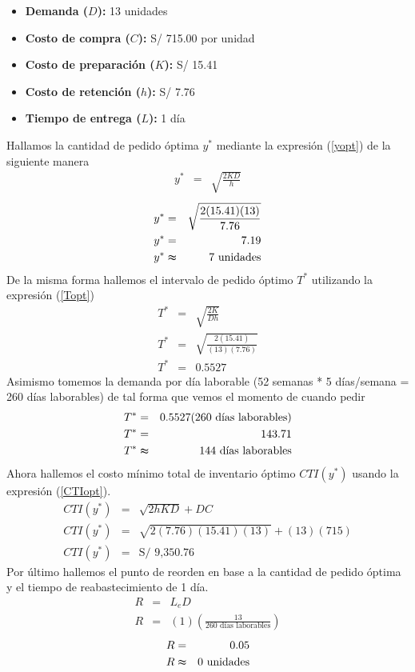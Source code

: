 \begin{itemize}
    \item \textbf{Demanda ($D$):} 13 unidades
    \item \textbf{Costo de compra ($C$):} S/ 715.00 por unidad
    \item \textbf{Costo de preparación ($K$):} S/ 15.41
    \item \textbf{Costo de retención ($h$):} S/ 7.76
    \item \textbf{Tiempo de entrega ($L$):} 1 día
\end{itemize}

Hallamos la cantidad de pedido óptima $y^*$ mediante la expresión (\ref{yopt}) de la siguiente manera
\begin{eqnarray}
    y^* &=& \sqrt{\frac{2KD}{h}} \nonumber
\end{eqnarray}
\begin{eqnarray}
    y^* &=& \sqrt{\frac{2(15.41)(13)}{7.76}} \nonumber \\
    y^* &=& 7.19 \nonumber \\
    y^* &\thickapprox& 7 \text{ unidades} \nonumber
\end{eqnarray}
De la misma forma hallemos el intervalo de pedido óptimo $T^*$ utilizando la expresión (\ref{Topt}) 
\begin{eqnarray}
    T^* &=& \sqrt{\frac{2K}{Dh}} \nonumber \\
    T^* &=& \sqrt{\frac{2(15.41)}{(13)(7.76)}} \nonumber \\
    T^* &=& 0.5527 \nonumber
\end{eqnarray}
Asimismo tomemos la demanda por día laborable (52 semanas * 5 días/semana = 260 días laborables) de tal forma que vemos el momento de cuando pedir
\begin{eqnarray}
    T^* &=& 0.5527 (260 \text{ días laborables}) \nonumber \\   
    T^* &=& 143.71 \nonumber \\
    T^* &\thickapprox& 144 \text{ días laborables} \nonumber
\end{eqnarray}
Ahora hallemos el costo mínimo total de inventario óptimo $CTI(y^*)$ usando la expresión (\ref{CTIopt}).
\begin{eqnarray}
    CTI(y^*) &=& \sqrt{2hKD} + DC \nonumber \\
    CTI(y^*) &=& \sqrt{2(7.76)(15.41)(13)} + (13)(715) \nonumber \\
    CTI(y^*) &=& \text{S/ 9,350.76} \nonumber
\end{eqnarray}
Por último hallemos el punto de reorden en base a la cantidad de pedido óptima y el tiempo de reabastecimiento de 1 día.
\begin{eqnarray}
    R &=& L_e D \nonumber \\
    R &=& (1) \left(\frac{13}{260 \text{ días laborables}} \right) \nonumber
\end{eqnarray}
\begin{eqnarray}
    R &=& 0.05 \nonumber \\
    R &\thickapprox& 0 \text{ unidades} \nonumber
\end{eqnarray}

